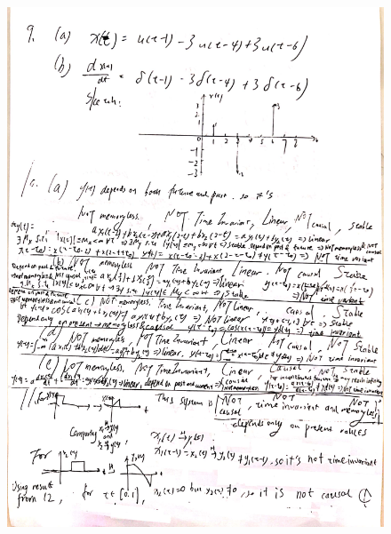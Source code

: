 \documentclass[a4paper]{article}
\begin{document}
\begin{figure}[H]
  \begin{center}
    \includegraphics[width=1\textwidth]{9-11(b).jpg}
  \end{center}
\end{figure}
\end{document}
